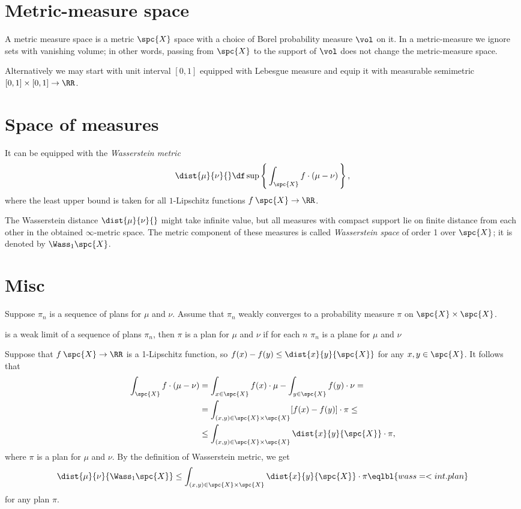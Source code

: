 \qeds

\section{Metric-measure space}

A metric measure space is a metric $\spc{X}$ space with a choice of Borel probability measure $\vol$ on it.
In a metric-measure we ignore sets with vanishing volume; in other words, passing from $\spc{X}$ to the support of $\vol$ does not change the metric-measure space.

Alternatively we may start with unit interval $[0,1]$ equipped with Lebesgue measure and equip it with measurable semimetric $[0,1]\times [0,1]\to \RR$.





\section{Space of measures}


It can be equipped with the \emph{Wasserstein metric}
\[\dist{\mu}{\nu}{}\df\sup\left\{\,\int_{\spc{X}} f\cdot(\mu-\nu)\,\right\},\]
where the least upper bound is taken for all $1$-Lipschitz functions $f\:\spc{X}\to\RR$.

The Wasserstein distance $\dist{\mu}{\nu}{}$ might take infinite value, but all measures with compact support lie on finite distance from each other in the obtained $\infty$-metric space.
The metric component of these measures is called \emph{Wasserstein space} of order 1 over $\spc{X}$; 
it is denoted by $\Wass_1\spc{X}$.



\section{Misc}

Suppose $\pi_n$ is a sequence of plans for $\mu$ and $\nu$.
Assume that $\pi_n$ weakly converges to a probability measure $\pi$ on $\spc{X}\times\spc{X}$.

is a weak limit of a sequence of plans $\pi_n$, then $\pi$ is a plan for $\mu$ and $\nu$ if for each $n$ $\pi_n$ is a plane for $\mu$ and $\nu$ 

Suppose that $f\:\spc{X}\to \RR$ is a 1-Lipschitz function,
so $f(x)-f(y)\le\dist{x}{y}{\spc{X}}$ for any $x,y\in \spc{X}$.
It follows that 
\begin{align*}
\int_{\spc{X}} f\cdot(\mu-\nu)&=\int_{x\in\spc{X}}f(x)\cdot\mu-\int_{y\in\spc{X}}f(y)\cdot\nu=
\\
&=\int_{(x,y)\in\spc{X}\times\spc{X}}[f(x)-f(y)]\cdot \pi\le
\\
&\le\int_{(x,y)\in\spc{X}\times\spc{X}}\dist{x}{y}{\spc{X}}\cdot \pi,
\end{align*}
where $\pi$ is a plan for $\mu$ and $\nu$.
By the definition of Wasserstein metric, we get  
\[\dist{\mu}{\nu}{\Wass_1\spc{X}}\le \int_{(x,y)\in\spc{X}\times\spc{X}}\dist{x}{y}{\spc{X}}\cdot\pi\eqlbl{wass=<int.plan}\]
for any plan $\pi$.

